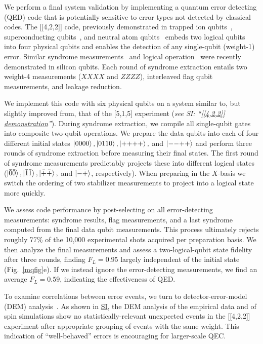\documentclass[aps,prl,twocolumn,superscriptaddress,nobibnotes,10pt,floatfix]{revtex4-2}
\newcommand{\figsubref}[2]{Fig.~\ref{#1}{#2}}
\newcommand{\SIlink}[2]{\textit{see SI: ``\hyperref[#2]{#1}''}}
\begin{document}
	We perform a final system validation by implementing a quantum error detecting (QED) code that is potentially sensitive to error types not detected by classical codes.
	The [[4,2,2]] code, previously demonstrated in trapped ion qubits~\cite{linke_fault-tolerant_2017,dam_end--end_2024}, superconducting qubits~\cite{takita_IBMrep_2017}, and neutral atom qubits~\cite{reichardt_422_2025} embeds two logical qubits into four physical qubits and enables the detection of any single-qubit (weight-1) error.
	Similar syndrome measurements~\cite{undseth_weight-four_2026} and logical operation~\cite{zhang_422_2026} were recently demonstrated in silicon qubits.
	Each round of syndrome extraction entails two weight-4 measurements (\(XXXX\) and \(ZZZZ\)), interleaved flag qubit measurements, and leakage reduction.

	We implement this code with six physical qubits on a system similar to, but slightly improved from, that of the {[}5,1,5{]} experiment (\SIlink{{[}{[}4,2,2{]}{]} demonstration}{demonstration-422}).
	During syndrome extraction, we compile all single-qubit gates into composite two-qubit operations.
	We prepare the data qubits into each of four different initial states $\ket{0000}, \ket{0110}, \ket{{+}{+}{+}{+}},$ and $\ket{{-}{-}{+}{+}}$ and perform three rounds of syndrome extraction before measuring their final states.
	The first round of syndrome measurements predictably projects these into different logical states ($\ket{\bar{0}\bar{0}}, \ket{\bar{1}\bar{1}}, \ket{\bar{+}\bar{+}},$ and $\ket{\bar{-}\bar{+}}$, respectively).
	When preparing in the $X$-basis we switch the ordering of two stabilizer measurements to project into a logical state more quickly.

	We assess code performance by post-selecting on all error-detecting measurements: syndrome results, flag measurements, and a last syndrome computed from the final data qubit measurements.
	This process ultimately rejects roughly 77\% of the 10,000 experimental shots acquired per preparation basis.
	We then analyze the final measurements and assess a two-logical-qubit state fidelity after three rounds, finding $F_L=0.95$ largely independent of the initial state (\figsubref{mqfig}{e}).
	If we instead ignore the error-detecting measurements, we find an average $F_L=0.59$, indicating the effectiveness of QED.

	To examine correlations between error events, we turn to detector-error-model (DEM) analysis~\cite{chen_decoders_2022,arms_estimating_2026,blume-kohout_estimating_2025}.
	As shown in \hyperref[dem-analysis-422]{SI}, the DEM analysis of the empirical data and of spin simulations show no statistically-relevant unexpected events in the [[4,2,2]] experiment after appropriate grouping of events with the same weight.
	This indication of ``well-behaved'' errors is encouraging for larger-scale QEC.
\end{document}
